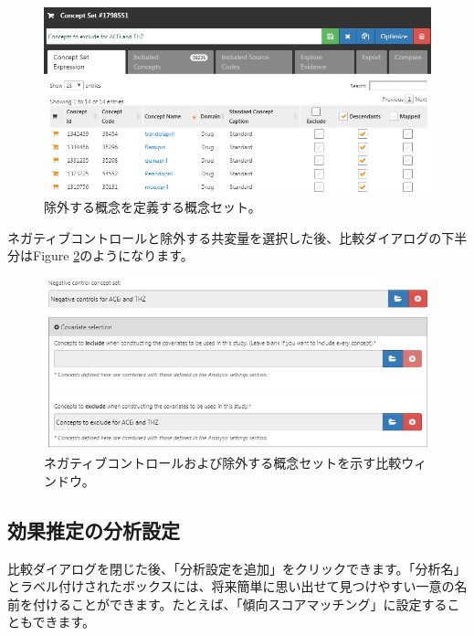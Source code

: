 \documentclass[
  11pt]{book}
\theoremstyle{definition}
\theoremstyle{definition}
\theoremstyle{definition}
\theoremstyle{definition}
\theoremstyle{remark}
\begin{document}
\begin{figure}

{\centering \includegraphics[width=1\linewidth]{images/PopulationLevelEstimation/covsToExclude} 

}

\caption{除外する概念を定義する概念セット。}\label{fig:covsToExclude}
\end{figure}

ネガティブコントロールと除外する共変量を選択した後、比較ダイアログの下半分はFigure \ref{fig:comparisons2}のようになります。

\begin{figure}

{\centering \includegraphics[width=1\linewidth]{images/PopulationLevelEstimation/comparisons2} 

}

\caption{ネガティブコントロールおよび除外する概念セットを示す比較ウィンドウ。}\label{fig:comparisons2}
\end{figure}

\subsection{効果推定の分析設定}\label{ux52b9ux679cux63a8ux5b9aux306eux5206ux6790ux8a2dux5b9a}

比較ダイアログを閉じた後、「分析設定を追加」をクリックできます。「分析名」とラベル付けされたボックスには、将来簡単に思い出せて見つけやすい一意の名前を付けることができます。たとえば、「傾向スコアマッチング」に設定することもできます。
\end{document}
